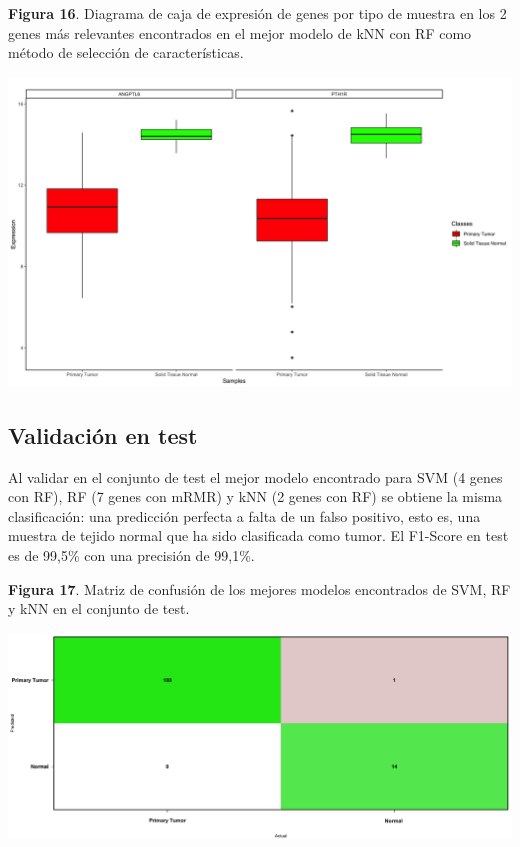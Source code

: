 \newpage
\begin{center}
\textbf{Figura 16}. Diagrama de caja de expresión de genes por tipo de muestra en los 2 genes más relevantes encontrados en el mejor modelo de kNN con RF como método de selección de características.
\end{center}
\begin{center}
	\includegraphics[width=1\textwidth]{figuras/16_higado_biclase_43_knn_boxplots_mejor_metodo.png} 
\end{center}

\newpage

\subsection{Validación en test}

Al validar en el conjunto de test el mejor modelo encontrado para SVM (4 genes con RF), RF (7 genes con mRMR) y kNN (2 genes con RF) se obtiene la misma clasificación: una predicción perfecta a falta de un falso positivo, esto es, una muestra de tejido normal que ha sido clasificada como tumor. El F1-Score en test es de 99,5\% con una precisión de 99,1\%.

\begin{center}
	\textbf{Figura 17}. Matriz de confusión de los mejores modelos encontrados de SVM, RF y kNN en el conjunto de test.
\end{center}

\begin{center}
	\includegraphics[width=1\textwidth]{figuras/17_higado_biclase_18_svm_matriz_confusion_mejor_metodo.png} 
\end{center}

